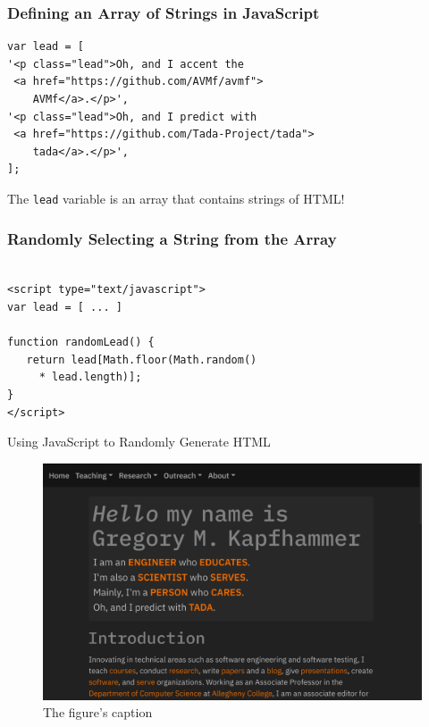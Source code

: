 \documentclass[14pt,aspectratio=169]{beamer}
\begin{document}
%
\begin{frame}[fragile]
  \frametitle{Defining an Array of Strings in JavaScript}
  \normalsize
  \begin{minipage}{6in}
    \vspace*{.2in}
    \begin{verbatim}
var lead = [
'<p class="lead">Oh, and I accent the
 <a href="https://github.com/AVMf/avmf">
    AVMf</a>.</p>',
'<p class="lead">Oh, and I predict with
 <a href="https://github.com/Tada-Project/tada">
    tada</a>.</p>',
];
    \end{verbatim}
  \end{minipage}
  \vspace*{.1in}
  \begin{center}
    The {\tt lead} variable is an array that contains strings of HTML!
  \end{center}
\end{frame}

%
\begin{frame}[fragile]
  \frametitle{Randomly Selecting a String from the Array}
  \normalsize
  \begin{minipage}{6in}
    \vspace*{.2in}
    \begin{verbatim}

<script type="text/javascript">
var lead = [ ... ]

function randomLead() {
   return lead[Math.floor(Math.random()
     * lead.length)];
}
</script>

    \end{verbatim}
  \end{minipage}
\end{frame}

%
\begin{frame}{Using JavaScript to Randomly Generate HTML}
  \begin{figure}
    \centering
    \includegraphics[scale=.08]{images/javascript-web-site.png}
    \caption{The figure's caption}
  \end{figure}
\end{frame}
\end{document}
